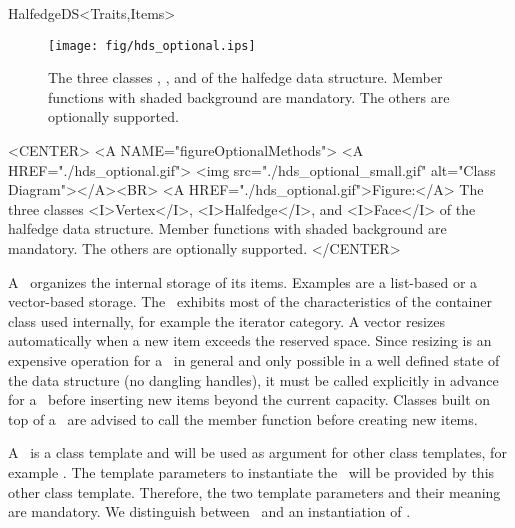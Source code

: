 \begin{ccRefConcept}{HalfedgeDS<Traits,Items>}
\begin{ccTexOnly}
    \begin{figure}[bht]
        \begin{center}
          \parbox{\textwidth}{%
              \texttt{[image: fig/hds\_optional.ips]}%
          }
        \end{center}
        \caption{The three classes \protect{}, 
          \protect{}, and 
          \protect{} of the halfedge data structure. Member
          functions with shaded background are mandatory. The others
          are optionally supported.}
        \label{figureOptionalMethods}
    \end{figure}
\end{ccTexOnly}

\begin{ccHtmlOnly}
    <CENTER>
    <A NAME="figureOptionalMethods">
    <A HREF="./hds_optional.gif">
        <img src="./hds_optional_small.gif" 
             alt="Class Diagram"></A><BR>
    <A HREF="./hds_optional.gif">Figure:</A>
    The three classes <I>Vertex</I>, <I>Halfedge</I>, and 
          <I>Face</I> of the halfedge data structure. Member
          functions with shaded background are mandatory. The others
          are optionally supported.
    </CENTER>
\end{ccHtmlOnly}

A \ccRefName\ organizes the internal storage of its items.  Examples
are a list-based or a vector-based storage. The \ccRefName\ exhibits
most of the characteristics of the container class used internally,
for example the iterator category. A vector resizes
automatically when a new item exceeds the reserved space. Since
resizing is an expensive operation for a \ccRefName\ in general and
only possible in a well defined state of the data structure (no
dangling handles), it must be called explicitly in advance for a
\ccRefName\ before inserting new items beyond the current capacity.
Classes built on top of a \ccRefName\ are advised to call the
 member function before creating new items.

\ccParameters

A \ccRefName\ is a class template and will be used as argument for
other class templates, for example . The
template parameters to instantiate the \ccRefName\ will be provided by
this other class template. Therefore, the two template parameters and
their meaning are mandatory. We distinguish between \ccRefName\ and 
an instantiation of \ccRefName.


\end{ccRefConcept}
